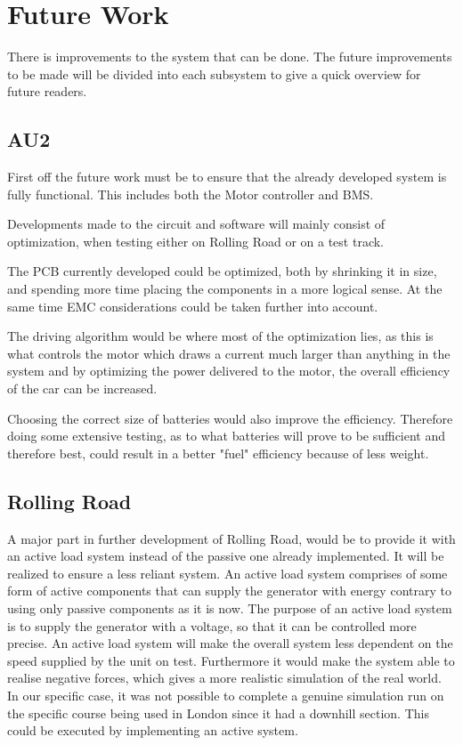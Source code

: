 \chapter {Future Work}
There is improvements to the system that can be done. The future improvements to be made will be divided into each subsystem to give a quick overview for future readers. 

\section{AU2}
First off the future work must be to ensure that the already developed system is fully functional. This includes both the Motor controller and BMS.

Developments made to the circuit and software will mainly consist of optimization, when testing either on Rolling Road or on a test track. 

The PCB currently developed could be optimized, both by shrinking it in size, and spending more time placing the components in a more logical sense. At the same time EMC considerations could be taken further into account. 

The driving algorithm would be where most of the optimization lies, as this is what controls the motor which draws a current much larger than anything in the system and by optimizing the power delivered to the motor, the overall efficiency of the car can be increased. 

Choosing the correct size of batteries would also improve the efficiency. Therefore doing some extensive testing, as to what batteries will prove to be sufficient and therefore best, could result in a better "fuel" efficiency because of less weight.  

\section{Rolling Road}
A major part in further development of Rolling Road, would be to provide it with an active load system instead of the passive one already implemented. It will be realized to ensure a less reliant system. An active load system comprises of some form of active components that can supply the generator with energy contrary to using only passive components as it is now. The purpose of an active load system is to supply the generator with a voltage, so that it can be controlled more precise. An active load system will make the overall system less dependent on the speed supplied by the unit on test. Furthermore it would make the system able to realise negative forces, which gives a more realistic simulation of the real world. In our specific case, it was not possible to complete a genuine simulation run on the specific course being used in London since it had a downhill section. This could be executed by implementing an active system. 

